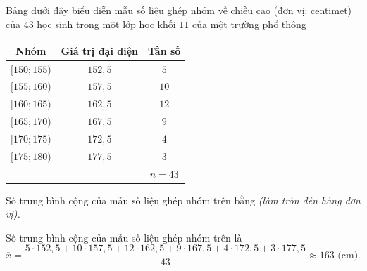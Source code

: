 \begin{ex}%
	Bảng dưới đây biểu diễn mẫu số liệu ghép nhóm về chiều cao (đơn vị: centimet) của $43$ học sinh trong một lớp học khối $11$ của một trường phổ thông
	\begin{center}
		\begin{tabular}{|c|c|c|}
			\hline
			Nhóm & Giá trị đại diện & Tần số \\
			\hline
			$[150;155)$ & $152{,}5$ & $5$ \\
			\hline
			$[155;160)$ & $157{,}5$ & $10$ \\
			\hline
			$[160;165)$ & $162{,}5$ & $12$ \\
			\hline
			$[165;170)$ & $167{,}5$ & $9$ \\
			\hline
			$[170;175)$ & $172{,}5$ & $4$ \\
			\hline
			$[175;180)$ & $177{,}5$ & $3$ \\
			\hline
			& & $n=43$ \\
			\hline
		\end{tabular}
	\end{center}
	Số trung bình cộng của mẫu số liệu ghép nhóm trên bằng \textit{(làm tròn đến hàng đơn vị).}
	
	\loigiai
	{
		Số trung bình cộng của mẫu số liệu ghép nhóm trên là
		$$\overline{x}=\dfrac{5\cdot 152{,}5+10\cdot 157{,}5+12\cdot 162{,}5+9\cdot 167{,}5+4\cdot 172{,}5+3\cdot 177{,}5}{43} \approx 163 \text{ (cm).}$$
	}
\end{ex}


